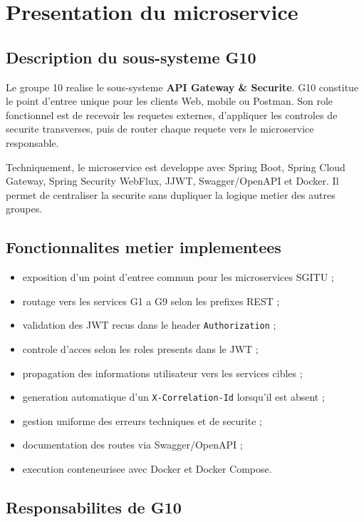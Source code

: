 \documentclass[12pt, a4paper]{article}
\begin{document}
\section{Presentation du microservice}

\subsection{Description du sous-systeme G10}

Le groupe 10 realise le sous-systeme \textbf{API Gateway \& Securite}. G10 constitue le point d'entree unique pour les clients Web, mobile ou Postman. Son role fonctionnel est de recevoir les requetes externes, d'appliquer les controles de securite transverses, puis de router chaque requete vers le microservice responsable.

Techniquement, le microservice est developpe avec Spring Boot, Spring Cloud Gateway, Spring Security WebFlux, JJWT, Swagger/OpenAPI et Docker. Il permet de centraliser la securite sans dupliquer la logique metier des autres groupes.

\subsection{Fonctionnalites metier implementees}

\begin{itemize}
  \item exposition d'un point d'entree commun pour les microservices SGITU ;
  \item routage vers les services G1 a G9 selon les prefixes REST ;
  \item validation des JWT recus dans le header \texttt{Authorization} ;
  \item controle d'acces selon les roles presents dans le JWT ;
  \item propagation des informations utilisateur vers les services cibles ;
  \item generation automatique d'un \texttt{X-Correlation-Id} lorsqu'il est absent ;
  \item gestion uniforme des erreurs techniques et de securite ;
  \item documentation des routes via Swagger/OpenAPI ;
  \item execution conteneurisee avec Docker et Docker Compose.
\end{itemize}

\subsection{Responsabilites de G10}
\end{document}

